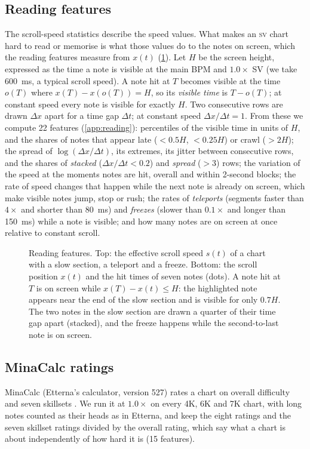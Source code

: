 \documentclass[10pt,twocolumn]{article}
\newcommand{\SV}{\textsc{sv}}
\begin{document}
\subsection{Reading features}\label{sec:reading}
The scroll-speed statistics describe the speed values. What makes an \SV{} chart hard to read or memorise is what those values do to the notes on screen, which the reading features measure from $x(t)$ (\cref{fig:reading}). Let $H$ be the screen height, expressed as the time a note is visible at the main BPM and $1.0\times$ SV (we take \SI{600}{ms}, a typical scroll speed). A note hit at $T$ becomes visible at the time $o(T)$ where $x(T)-x(o(T))=H$, so its \emph{visible time} is $T-o(T)$; at constant speed every note is visible for exactly $H$. Two consecutive rows are drawn $\Delta x$ apart for a time gap $\Delta t$; at constant speed $\Delta x/\Delta t=1$. From these we compute 22 features (\cref{app:reading}): percentiles of the visible time in units of $H$, and the shares of notes that appear late ($<0.5H$, $<0.25H$) or crawl ($>2H$); the spread of $\log(\Delta x/\Delta t)$, its extremes, its jitter between consecutive rows, and the shares of \emph{stacked} ($\Delta x/\Delta t<0.2$) and \emph{spread} ($>3$) rows; the variation of the speed at the moments notes are hit, overall and within 2-second blocks; the rate of speed changes that happen while the next note is already on screen, which make visible notes jump, stop or rush; the rates of \emph{teleports} (segments faster than $4\times$ and shorter than \SI{80}{ms}) and \emph{freezes} (slower than $0.1\times$ and longer than \SI{150}{ms}) while a note is visible; and how many notes are on screen at once relative to constant scroll.

\begin{figure}[t]
\centering
\resizebox{\columnwidth}{!}{}
\caption{Reading features. Top: the effective scroll speed $s(t)$ of a chart with a slow section, a teleport and a freeze. Bottom: the scroll position $x(t)$ and the hit times of seven notes (dots). A note hit at $T$ is on screen while $x(T)-x(t)\le H$: the highlighted note appears near the end of the slow section and is visible for only $0.7H$. The two notes in the slow section are drawn a quarter of their time gap apart (stacked), and the freeze happens while the second-to-last note is on screen.}
\label{fig:reading}
\end{figure}

\subsection{MinaCalc ratings}\label{sec:msd}
MinaCalc (Etterna's calculator, version 527) rates a chart on overall difficulty and seven skillsets \citep{minacalc}. We run it at $1.0\times$ on every 4K, 6K and 7K chart, with long notes counted as their heads as in Etterna, and keep the eight ratings and the seven skillset ratings divided by the overall rating, which say what a chart is about independently of how hard it is (15 features).
\end{document}
